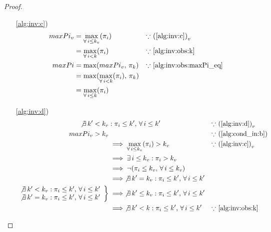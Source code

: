 \documentclass{article}
\begin{document}
\begin{proof}
\begin{itemize}
        \item[\ref{alg:inv:c})]
              \begin{align*}
                  maxPi_v
                   & = \max_{\forall\, i \leq k_v}(\pi_i)         & \because & \mbox{ (\ref{alg:inv:c})}_v        \\
                   & = \max_{\forall\, i < k}(\pi_i)              & \because & \mbox{ \ref{alg:inv:obs:k}}        \\
                  maxPi
                   & = \max(maxPi_v,\, \pi_k)                     & \because & \mbox{ \ref{alg:inv:obs:maxPi_eq}} \\
                   & = \max(\max_{\forall\, i < k}(\pi_i),\, \pi_k)                                                 \\
                   & = \max_{\forall\, i \leq k}(\pi_i)
              \end{align*}

        \item[\ref{alg:inv:d})]
              \begin{align*}
                  \not\exists\, k' < k_v & : \pi_i \leq k',\, \forall\, i \leq k'                                  & \because & \mbox{ (\ref{alg:inv:d})}_v   \\
                  maxPi_v > k_v        &                                                                    & \because & \mbox{ (\ref{alg:cond_in:b})} \\
                                       & \implies \max_{\forall\, i \leq k_v}(\pi_i) > k_v                    & \because & \mbox{ (\ref{alg:inv:c})}_v   \\
                                       & \implies \exists\, i \leq k_v : \pi_i > k_v                                                                     \\
                                       & \implies \neg(\pi_i \leq k_v,\, \forall\, i \leq k_v)                                                              \\
                                       & \implies \not\exists\, k' = k_v : \pi_i \leq k',\, \forall\, i \leq k'                                               \\
                  \left.
                  \begin{array}{r}
                      \not\exists\, k' < k_v : \pi_i \leq k',\, \forall\, i \leq k' \\
                      \not\exists\, k' = k_v : \pi_i \leq k',\, \forall\, i \leq k'
                  \end{array}
                  \right\}
                                       & \implies \not\exists\, k' \leq k_v : \pi_i \leq k',\, \forall\, i \leq k'                                            \\
                                       & \implies \not\exists\, k' < k : \pi_i \leq k',\, \forall\, i \leq k'      & \because & \mbox{ \ref{alg:inv:obs:k}}
              \end{align*}


\end{itemize}
\end{proof}
\end{document}
